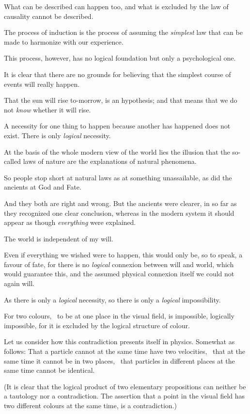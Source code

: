 {What can be described can happen too, and
what is excluded by the law of causality cannot be
described.}


{The process of induction is the process of
assuming the \emph{simplest} law that can be made to
harmonize with our experience.}


{This process, however, has no logical foundation
but only a psychological one.

It is clear that there are no grounds for believing
that the simplest course of events will really
happen.}


{That the sun will rise to-morrow, is an hypothesis;
and that means that we do not \emph{know} whether
it will rise.}


{A necessity for one thing to happen because
another has happened does not exist. There is
only \emph{logical} necessity.}


{At the basis of the whole modern view of
the world lies the illusion that the so-called
laws of nature are the explanations of natural
phenomena.}


{So people stop short at natural laws as at something
unassailable, as did the ancients at God
and Fate.

And they both are right and wrong. But the
ancients were clearer, in so far as they recognized
one clear conclusion, whereas in the modern
system it should appear as though \emph{everything} were
explained.}


{The world is independent of my will.}


{Even if everything we wished were to happen,
this would only be, so to speak, a favour of
fate, for there is no \emph{logical} connexion between will
and world, which would guarantee this, and the
assumed physical connexion itself we could not
again will.}


{As there is only a \emph{logical} necessity, so there is
only a \emph{logical} impossibility.}


{For two colours, \exempliGratia\ to be at one place in the
visual field, is impossible, logically impossible,
for it is excluded by the logical structure of
colour.

Let us consider how this contradiction presents
itself in physics. Somewhat as follows: That a
particle cannot at the same time have two velocities,
\idEst\ that at the same time it cannot be in
two places, \idEst\ that particles in different places
at the same time cannot be identical.

(It is clear that the logical product of two
elementary propositions can neither be a tautology
nor a contradiction. The assertion that a point
in the visual field has two different colours at the
same time, is a contradiction.)}


